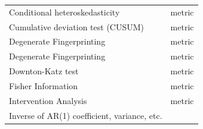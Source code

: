 \documentclass[12pt,twoside,openany]{reedthesis}
\begin{document}
\begin{longtable}[]{@{}lc@{}}
\begin{minipage}[t]{0.43\columnwidth}
Conditional heteroskedasticity\strut
\end{minipage} & \begin{minipage}[t]{0.35\columnwidth}\centering
metric\strut
\end{minipage}\tabularnewline
\begin{minipage}[t]{0.43\columnwidth}\raggedright
Cumulative deviation test
(CUSUM)\strut
\end{minipage} & \begin{minipage}[t]{0.35\columnwidth}\centering
metric\strut
\end{minipage}\tabularnewline
\begin{minipage}[t]{0.43\columnwidth}\raggedright
Degenerate Fingerprinting\strut
\end{minipage} & \begin{minipage}[t]{0.35\columnwidth}\centering
metric\strut
\end{minipage}\tabularnewline
\begin{minipage}[t]{0.43\columnwidth}\raggedright
Degenerate Fingerprinting\strut
\end{minipage} & \begin{minipage}[t]{0.35\columnwidth}\centering
metric\strut
\end{minipage}\tabularnewline
\begin{minipage}[t]{0.43\columnwidth}\raggedright
Downton-Katz test\strut
\end{minipage} & \begin{minipage}[t]{0.35\columnwidth}\centering
metric\strut
\end{minipage}\tabularnewline
\begin{minipage}[t]{0.43\columnwidth}\raggedright
Fisher Information\strut
\end{minipage} & \begin{minipage}[t]{0.35\columnwidth}\centering
metric\strut
\end{minipage}\tabularnewline
\begin{minipage}[t]{0.43\columnwidth}\raggedright
Intervention Analysis\strut
\end{minipage} & \begin{minipage}[t]{0.35\columnwidth}\centering
metric\strut
\end{minipage}\tabularnewline
\begin{minipage}[t]{0.43\columnwidth}\raggedright
Inverse of AR(1) coefficient,
variance, etc.\strut
\end{minipage} & \begin{minipage}[t]{0.35\columnwidth}\centering

\end{minipage}
\end{longtable}
\end{document}
